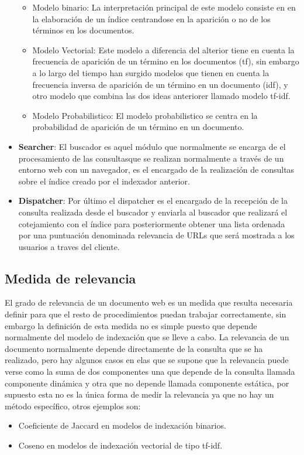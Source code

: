 \documentclass[a4paper, 11pt]{article} %
\begin{document}
\begin{itemize}
				\begin{itemize}
					\item Modelo binario: La interpretación principal de este modelo consiste en en la elaboración de un índice centrandose en la aparición o no de los términos en los documentos.
					\item Modelo Vectorial: Este modelo a diferencia del alterior tiene en cuenta la frecuencia de aparición de un término en los documentos (tf), sin embargo a lo largo del tiempo han surgido modelos que tienen en cuenta la frecuencia inversa de aparición de un término en un documento (idf), y otro modelo que combina las dos ideas anteriorer llamado modelo tf-idf.
					\item Modelo Probabilistico: El modelo probabilistico se centra en la probabilidad de aparición de un término en un documento.
				\end{itemize}
			\item \textbf{Searcher}: El buscador es aquel módulo que normalmente se encarga de el procesamiento de las consultasque se realizan normalmente a través de un entorno web con un navegador, es el encargado de la realización de consultas sobre el índice creado por el indexador anterior.
			\item \textbf{Dispatcher}: Por último el dispatcher es el encargado de la recepción de la consulta realizada desde el buscador y enviarla al buscador que realizará el cotejamiento con el índice para posteriormente obtener una lista ordenada por una puntuación denominada relevancia de URLs que será mostrada a los usuarios a traves del cliente.
		\end{itemize}

		\subsection{Medida de relevancia}
		El grado de relevancia de un documento web es un medida que resulta necesaria definir para que el resto de procedimientos puedan trabajar correctamente, sin embargo la definición de esta medida no es simple puesto que depende normalmente del modelo de indexación que se lleve a cabo. La relevancia de un documento normalmente depende directamente de la consulta que se ha realizado, pero hay algunos casos en elas que se supone que la relevancia puede verse como la suma de dos componentes una que depende de la consulta llamada componente dinámica y otra que no depende llamada componente estática, por supuesto esta no es la única forma de medir la relevancia ya que no hay un método específico, otros ejemplos son:
		\begin{itemize}
			\item Coeficiente de Jaccard en modelos de indexación binarios.
			\item Coseno en modelos de indexación vectorial de tipo tf-idf.
		\end{itemize}
\end{document}
